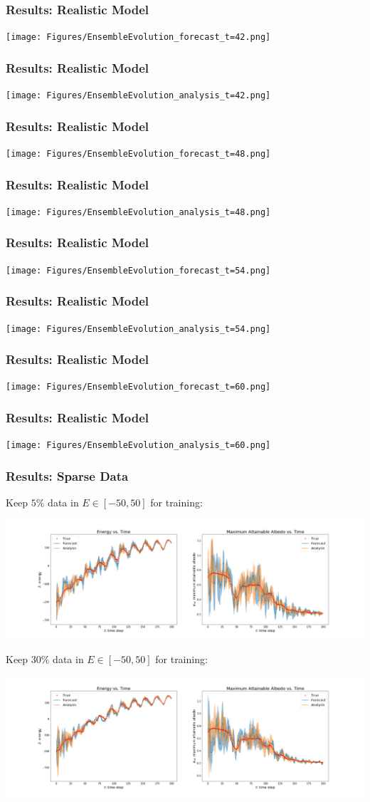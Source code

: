\documentclass{beamer}
\begin{document}
\begin{frame}
\frametitle{Results: Realistic Model}
\centering
\texttt{[image: Figures/EnsembleEvolution\_forecast\_t=42.png]}
\end{frame}
\begin{frame}
\frametitle{Results: Realistic Model}
\centering
\texttt{[image: Figures/EnsembleEvolution\_analysis\_t=42.png]}
\end{frame}
\begin{frame}
\frametitle{Results: Realistic Model}
\centering
\texttt{[image: Figures/EnsembleEvolution\_forecast\_t=48.png]}
\end{frame}
\begin{frame}
\frametitle{Results: Realistic Model}
\centering
\texttt{[image: Figures/EnsembleEvolution\_analysis\_t=48.png]}
\end{frame}
\begin{frame}
\frametitle{Results: Realistic Model}
\centering
\texttt{[image: Figures/EnsembleEvolution\_forecast\_t=54.png]}
\end{frame}
\begin{frame}
\frametitle{Results: Realistic Model}
\centering
\texttt{[image: Figures/EnsembleEvolution\_analysis\_t=54.png]}
\end{frame}
\begin{frame}
\frametitle{Results: Realistic Model}
\centering
\texttt{[image: Figures/EnsembleEvolution\_forecast\_t=60.png]}
\end{frame}
\begin{frame}
\frametitle{Results: Realistic Model}
\centering
\texttt{[image: Figures/EnsembleEvolution\_analysis\_t=60.png]}
\end{frame}

\begin{frame}
\frametitle{Results: Sparse Data}
{\setlength{\baselineskip}{0.001em}
\tiny{Keep $5\%$ data in $E\in[-50,50]$ for training:}
\begin{center}
\includegraphics[width=0.85\linewidth]{Figures/H_sparse_new.png} 
\end{center}
\tiny{Keep $30\%$ data in $E\in[-50,50]$ for training:}
\begin{center}
\includegraphics[width=0.85\linewidth]{Figures/H_sparse_05_new.png} 
\end{center}
}
\end{frame}
\end{document}
